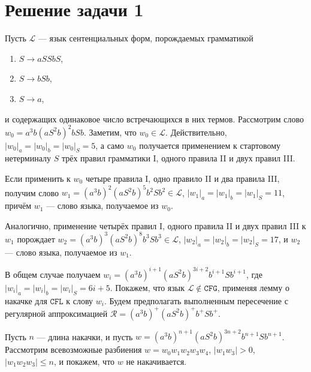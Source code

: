\documentclass{article}
\begin{document}
\section{Решение задачи 1}

Пусть $\mathcal{L}$ --- язык сентенциальных форм, порождаемых грамматикой
\begin{enumerate}[I]
  \item $S \to aSSbS$,
  \item $S \to bSb$,
  \item $S \to a$,
\end{enumerate}
и содержащих одинаковое число встречающихся в них термов. Рассмотрим слово
$w_0 = a^3 b (a S^2 b)^2 b S b$. Заметим, что $w_0 \in \mathcal{L}$.
Действительно, $|w_0|_a = |w_0|_b = |w_0|_S = 5$, а само $w_0$ получается
применением к стартовому нетерминалу $S$ трёх правил грамматики I, одного
правила II и двух правил III.

Если применить к $w_0$ четыре правила I, одно правило II и два правила III,
получим слово $w_1 = (a^3 b)^2 (a S^2 b)^5 b^2 S b^2 \in \mathcal{L}$,
$|w_1|_a = |w_1|_b = |w_1|_S = 11$, причём $w_1$ --- 
слово языка, получаемое из $w_0$.

Аналогично, применение четырёх правил I, одного правила II и двух правил III
к $w_1$ порождает $w_2 = (a^3 b)^3 (a S^2 b)^8 b^3 S b^3 \in \mathcal{L}$,
$|w_2|_a = |w_2|_b = |w_2|_S = 17$, и $w_2$ ---  слово
языка, получаемое из $w_1$.

В общем случае получаем $w_i = (a^3 b)^{i+1} (a S^2 b)^{3i+2} b^{i+1} S b^{i+1}$,
где $|w_i|_a = |w_i|_b = |w_i|_S = 6i + 5$. Покажем, что язык
$\mathcal{L} \notin \mathtt{CFG}$, применяя лемму о накачке для $\mathtt{CFL}$
к слову $w_i$. Будем предполагать выполненным пересечение с регулярной
аппроксимацией $\mathcal{R} = (a^3 b)^+ (a S^2 b)^+ b^+ S b^+$.

Пусть $n$ --- длина накачки, и пусть
$w = (a^3 b)^{n+1} (a S^2 b)^{3n+2} b^{n+1} S b^{n+1}$. Рассмотрим всевозможные
разбиения $w = w_0 w_1 w_2 w_3 w_4$, $|w_1 w_3| > 0$, $|w_1 w_2 w_3| \le n$, и
покажем, что $w$ не накачивается.
\end{document}
